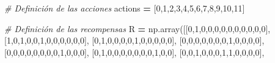 \documentclass[
]{book}
\newenvironment{Shaded}{\begin{snugshade}}{\end{snugshade}}
\newcommand{\CommentTok}[1]{\textcolor[rgb]{0.56,0.35,0.01}{\textit{#1}}}
\newcommand{\DecValTok}[1]{\textcolor[rgb]{0.00,0.00,0.81}{#1}}
\newcommand{\NormalTok}[1]{#1}
\newcommand{\OperatorTok}[1]{\textcolor[rgb]{0.81,0.36,0.00}{\textbf{#1}}}
\begin{document}
\begin{Shaded}
\begin{Highlighting}[]
\CommentTok{\# Definición de las acciones}
\NormalTok{actions }\OperatorTok{=}\NormalTok{ [}\DecValTok{0}\NormalTok{,}\DecValTok{1}\NormalTok{,}\DecValTok{2}\NormalTok{,}\DecValTok{3}\NormalTok{,}\DecValTok{4}\NormalTok{,}\DecValTok{5}\NormalTok{,}\DecValTok{6}\NormalTok{,}\DecValTok{7}\NormalTok{,}\DecValTok{8}\NormalTok{,}\DecValTok{9}\NormalTok{,}\DecValTok{10}\NormalTok{,}\DecValTok{11}\NormalTok{]}

\CommentTok{\# Definición de las recompensas}
\NormalTok{R }\OperatorTok{=}\NormalTok{ np.array([[}\DecValTok{0}\NormalTok{,}\DecValTok{1}\NormalTok{,}\DecValTok{0}\NormalTok{,}\DecValTok{0}\NormalTok{,}\DecValTok{0}\NormalTok{,}\DecValTok{0}\NormalTok{,}\DecValTok{0}\NormalTok{,}\DecValTok{0}\NormalTok{,}\DecValTok{0}\NormalTok{,}\DecValTok{0}\NormalTok{,}\DecValTok{0}\NormalTok{,}\DecValTok{0}\NormalTok{],}
\NormalTok{              [}\DecValTok{1}\NormalTok{,}\DecValTok{0}\NormalTok{,}\DecValTok{1}\NormalTok{,}\DecValTok{0}\NormalTok{,}\DecValTok{0}\NormalTok{,}\DecValTok{1}\NormalTok{,}\DecValTok{0}\NormalTok{,}\DecValTok{0}\NormalTok{,}\DecValTok{0}\NormalTok{,}\DecValTok{0}\NormalTok{,}\DecValTok{0}\NormalTok{,}\DecValTok{0}\NormalTok{],}
\NormalTok{              [}\DecValTok{0}\NormalTok{,}\DecValTok{1}\NormalTok{,}\DecValTok{0}\NormalTok{,}\DecValTok{0}\NormalTok{,}\DecValTok{0}\NormalTok{,}\DecValTok{0}\NormalTok{,}\DecValTok{1}\NormalTok{,}\DecValTok{0}\NormalTok{,}\DecValTok{0}\NormalTok{,}\DecValTok{0}\NormalTok{,}\DecValTok{0}\NormalTok{,}\DecValTok{0}\NormalTok{],}
\NormalTok{              [}\DecValTok{0}\NormalTok{,}\DecValTok{0}\NormalTok{,}\DecValTok{0}\NormalTok{,}\DecValTok{0}\NormalTok{,}\DecValTok{0}\NormalTok{,}\DecValTok{0}\NormalTok{,}\DecValTok{0}\NormalTok{,}\DecValTok{1}\NormalTok{,}\DecValTok{0}\NormalTok{,}\DecValTok{0}\NormalTok{,}\DecValTok{0}\NormalTok{,}\DecValTok{0}\NormalTok{],}
\NormalTok{              [}\DecValTok{0}\NormalTok{,}\DecValTok{0}\NormalTok{,}\DecValTok{0}\NormalTok{,}\DecValTok{0}\NormalTok{,}\DecValTok{0}\NormalTok{,}\DecValTok{0}\NormalTok{,}\DecValTok{0}\NormalTok{,}\DecValTok{0}\NormalTok{,}\DecValTok{1}\NormalTok{,}\DecValTok{0}\NormalTok{,}\DecValTok{0}\NormalTok{,}\DecValTok{0}\NormalTok{],}
\NormalTok{              [}\DecValTok{0}\NormalTok{,}\DecValTok{1}\NormalTok{,}\DecValTok{0}\NormalTok{,}\DecValTok{0}\NormalTok{,}\DecValTok{0}\NormalTok{,}\DecValTok{0}\NormalTok{,}\DecValTok{0}\NormalTok{,}\DecValTok{0}\NormalTok{,}\DecValTok{0}\NormalTok{,}\DecValTok{1}\NormalTok{,}\DecValTok{0}\NormalTok{,}\DecValTok{0}\NormalTok{],}
\NormalTok{              [}\DecValTok{0}\NormalTok{,}\DecValTok{0}\NormalTok{,}\DecValTok{1}\NormalTok{,}\DecValTok{0}\NormalTok{,}\DecValTok{0}\NormalTok{,}\DecValTok{0}\NormalTok{,}\DecValTok{1}\NormalTok{,}\DecValTok{1}\NormalTok{,}\DecValTok{0}\NormalTok{,}\DecValTok{0}\NormalTok{,}\DecValTok{0}\NormalTok{,}\DecValTok{0}\NormalTok{],}

\end{Highlighting}
\end{Shaded}
\end{document}
